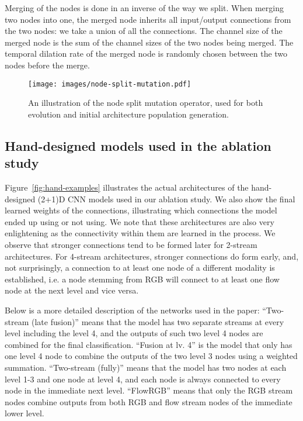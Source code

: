 \documentclass{article} \usepackage{iclr2020_conference,times}
\begin{document}
Merging of the nodes is done in an inverse of the way we split. When merging two nodes into one, the merged node inherits all input/output connections from the two nodes: we take a union of all the connections. The channel size of the merged node is the sum of the channel sizes of the two nodes being merged. The temporal dilation rate of the merged node is randomly chosen between the two nodes before the merge.




\begin{figure}
  \centering
   \texttt{[image: images/node-split-mutation.pdf]}\caption{An illustration of the node split mutation operator, used for both evolution and initial architecture population generation.}
  \label{fig:node-split}
\end{figure}


\subsection{Hand-designed models used in the ablation study}

Figure~\ref{fig:hand-examples} illustrates the actual architectures of the hand-designed (2+1)D CNN models used in our ablation study. We also show the final learned weights of the connections, illustrating which connections the model ended up using or not using. We note that these architectures are also very enlightening as the connectivity within them are learned in the process. We observe that stronger connections tend to be formed later for 2-stream architectures. For 4-stream architectures, stronger connections do form early, and, not surprisingly, a connection to at least one node of a different modality is established, i.e. a node stemming from RGB will connect to at least one flow node at the next level and vice versa.

Below is a more detailed description of the networks used in the paper:
``Two-stream (late fusion)'' means that the model has two separate streams at every level including the level 4, and the outputs of such two level 4 nodes are combined for the final classification. ``Fusion at lv. 4'' is the model that only has one level 4 node to combine the outputs of the two level 3 nodes using a weighted summation. ``Two-stream (fully)'' means that the model has two nodes at each level 1-3 and one node at level 4, and each node is always connected to every node in the immediate next level. ``FlowRGB'' means that only the RGB stream nodes combine outputs from both RGB and flow stream nodes of the immediate lower level.
\end{document}
